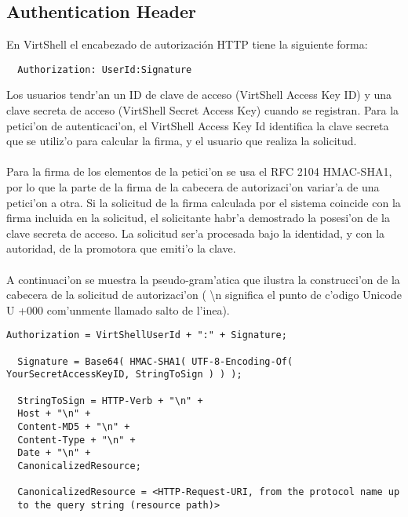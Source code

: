 \subsection{Authentication Header}

En VirtShell el encabezado de autorización HTTP tiene la siguiente forma:

\medskip
\begin{lstlisting}
  Authorization: UserId:Signature
\end{lstlisting}
\medskip

Los usuarios tendr'an un ID de clave de acceso (VirtShell Access Key ID) y una clave secreta de acceso (VirtShell Secret Access Key) cuando se registran. Para la petici'on de autenticaci'on, el VirtShell Access Key Id identifica la clave secreta que se utiliz'o para calcular la firma, y el usuario que realiza la solicitud.\\
\\
Para la firma de los elementos de la petici'on se usa el RFC 2104 HMAC-SHA1, por lo que la parte de la firma de la cabecera de autorizaci'on variar'a de una petici'on a otra. Si la solicitud de la firma calculada por el sistema coincide con la firma incluida en la solicitud, el solicitante habr'a demostrado la posesi'on de la clave secreta de acceso. La solicitud ser'a procesada bajo la identidad, y con la autoridad, de la promotora que emiti'o la clave.\\
\\
A continuaci'on se muestra la pseudo-gram'atica que ilustra la construcci'on de la cabecera de la solicitud de autorizaci'on (
\textbackslash{}n significa el punto de c'odigo Unicode U +000 com'unmente llamado salto de l'inea).

\medskip
\begin{lstlisting}[style=json, caption=cabecera de una solicitud de autorización]
  Authorization = VirtShellUserId + ":" + Signature;

  Signature = Base64( HMAC-SHA1( UTF-8-Encoding-Of( YourSecretAccessKeyID, StringToSign ) ) );

  StringToSign = HTTP-Verb + "\n" +
  Host + "\n" +
  Content-MD5 + "\n" +
  Content-Type + "\n" +
  Date + "\n" +
  CanonicalizedResource;

  CanonicalizedResource = <HTTP-Request-URI, from the protocol name up 
  to the query string (resource path)>
\end{lstlisting}

\vspace{5mm}

